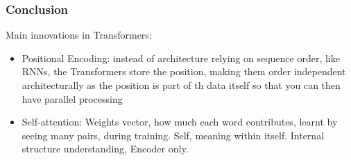 			

\begin{frame}[fragile]\frametitle{Conclusion}

Main innovations in Transformers:
\begin{itemize}
\item Positional Encoding: instead of architecture relying on sequence order, like RNNs, the Transformers store the position, making them order independent architecturally as the position is part of th data itself so that you can then have parallel processing
\item Self-attention: Weights vector, how much each word contributes, learnt by seeing many pairs, during training. Self, meaning within itself. Internal structure understanding, Encoder only.

			\end{itemize}
			
\end{frame}


			
			





